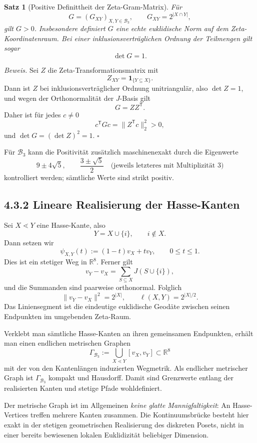 \documentclass[11pt,a4paper]{article}
\newtheorem{satz}{Satz}
\begin{document}
\begin{satz}[Positive Definittheit der Zeta-Gram-Matrix]
Für
\[
G=(G_{XY})_{X,Y\in\mathcal B_3},\qquad G_{XY}=2^{|X\cap Y|},
\]
gilt $G>0$. Insbesondere definiert $G$ eine echte euklidische Norm auf dem Zeta-Koordinatenraum. Bei einer inklusionsverträglichen Ordnung der Teilmengen gilt sogar
\[
\boxed{\det G=1.}
\]
\end{satz}

\textit{Beweis.}
Sei $Z$ die Zeta-Transformationsmatrix mit
\[
Z_{XY}=\mathbf 1_{\{Y\subseteq X\}}.
\]
Dann ist $Z$ bei inklusionsverträglicher Ordnung unitriangulär, also $\det Z=1$, und wegen der Orthonormalität der $J$-Basis gilt
\[
G=ZZ^{\mathsf T}.
\]
Daher ist für jedes $c\neq0$
\[
c^{\mathsf T}Gc=\|Z^{\mathsf T}c\|_2^2>0,
\]
und $\det G=(\det Z)^2=1$. \hfill$\square$

Für $\mathcal B_3$ kann die Positivität zusätzlich maschinenexakt durch die Eigenwerte
\[
9\pm4\sqrt5,
\qquad
\frac{3\pm\sqrt5}{2}
\quad\text{(jeweils letzteres mit Multiplizität $3$)}
\]
kontrolliert werden; sämtliche Werte sind strikt positiv.

\subsection*{4.3.2 Lineare Realisierung der Hasse-Kanten}
Sei $X\lessdot Y$ eine Hasse-Kante, also
\[
Y=X\cup\{i\},\qquad i\notin X.
\]
Dann setzen wir
\[
\psi_{X,Y}(t):=(1-t)v_X+t v_Y,
\qquad 0\le t\le1.
\]
Dies ist ein stetiger Weg in $\mathbb R^8$. Ferner gilt
\[
v_Y-v_X
=\sum_{S\subseteq X}J(S\cup\{i\}),
\]
und die Summanden sind paarweise orthonormal. Folglich
\[
\boxed{
\|v_Y-v_X\|^2=2^{|X|},
\qquad
\ell(X,Y)=2^{|X|/2}.}
\]
Das Liniensegment ist die eindeutige euklidische Geodäte zwischen seinen Endpunkten im umgebenden Zeta-Raum.

Verklebt man sämtliche Hasse-Kanten an ihren gemeinsamen Endpunkten, erhält man einen endlichen metrischen Graphen
\[
\Gamma_{\mathcal B_3}:=\bigcup_{X\lessdot Y}[v_X,v_Y]\subset\mathbb R^8
\]
mit der von den Kantenlängen induzierten Wegmetrik. Als endlicher metrischer Graph ist $\Gamma_{\mathcal B_3}$ kompakt und Hausdorff. Damit sind Grenzwerte entlang der realisierten Kanten und stetige Pfade wohldefiniert.

\begin{warningbox}
Der metrische Graph ist im Allgemeinen \emph{keine glatte Mannigfaltigkeit}: An Hasse-Vertices treffen mehrere Kanten zusammen. Die Kontinuumsbrücke besteht hier exakt in der stetigen geometrischen Realisierung des diskreten Posets, nicht in einer bereits bewiesenen lokalen Euklidizität beliebiger Dimension.
\end{warningbox}
\end{document}
